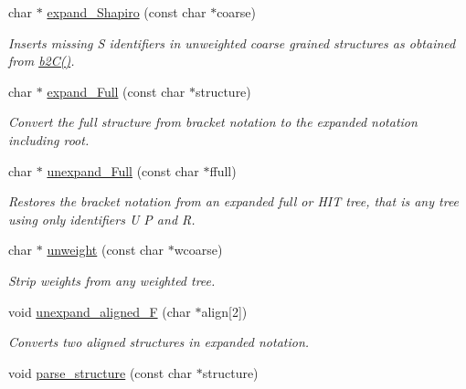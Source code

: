 \begin{DoxyCompactItemize}
char $\ast$ \mbox{\hyperlink{group__struct__utils__deprecated_gabe3d815b420dc4553bfb23511198b4c6}{expand\+\_\+\+Shapiro}} (const char $\ast$coarse)
\begin{DoxyCompactList}\small\item\em Inserts missing \textquotesingle{}S\textquotesingle{} identifiers in unweighted coarse grained structures as obtained from \mbox{\hyperlink{group__struct__utils__deprecated_ga9c80d92391f2833549a8b6dac92233f0}{b2\+C()}}. \end{DoxyCompactList}\item 
char $\ast$ \mbox{\hyperlink{group__struct__utils__deprecated_ga78d73cd54a068ef2812812771cdddc6f}{expand\+\_\+\+Full}} (const char $\ast$structure)
\begin{DoxyCompactList}\small\item\em Convert the full structure from bracket notation to the expanded notation including root. \end{DoxyCompactList}\item 
char $\ast$ \mbox{\hyperlink{group__struct__utils__deprecated_ga260c4b622093b76a883bf96628280de1}{unexpand\+\_\+\+Full}} (const char $\ast$ffull)
\begin{DoxyCompactList}\small\item\em Restores the bracket notation from an expanded full or H\+IT tree, that is any tree using only identifiers \textquotesingle{}U\textquotesingle{} \textquotesingle{}P\textquotesingle{} and \textquotesingle{}R\textquotesingle{}. \end{DoxyCompactList}\item 
char $\ast$ \mbox{\hyperlink{group__struct__utils__deprecated_ga09a80253ac7b6bae606871ba7c6e5136}{unweight}} (const char $\ast$wcoarse)
\begin{DoxyCompactList}\small\item\em Strip weights from any weighted tree. \end{DoxyCompactList}\item 
void \mbox{\hyperlink{group__struct__utils__deprecated_ga1054c4477d53b31d79d4cb132100e87a}{unexpand\+\_\+aligned\+\_\+F}} (char $\ast$align\mbox{[}2\mbox{]})
\begin{DoxyCompactList}\small\item\em Converts two aligned structures in expanded notation. \end{DoxyCompactList}\item 
void \mbox{\hyperlink{group__struct__utils__deprecated_ga3c79042e6bf6f01706bf30ec9e69e8ac}{parse\+\_\+structure}} (const char $\ast$structure)

\end{DoxyCompactItemize}
